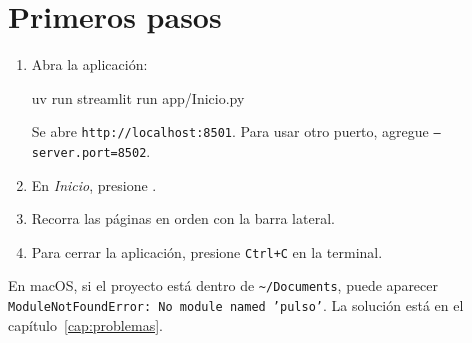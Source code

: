 \section{Primeros pasos}
\begin{enumerate}
\item Abra la aplicación:
\begin{terminal}
uv run streamlit run app/Inicio.py
\end{terminal}
Se abre \texttt{http://localhost:8501}. Para usar otro puerto, agregue
\texttt{--server.port=8502}.
\item En \emph{Inicio}, presione .
\item Recorra las páginas en orden con la barra lateral.
\item Para cerrar la aplicación, presione \texttt{Ctrl+C} en la terminal.
\end{enumerate}

\begin{aviso}
En macOS, si el proyecto está dentro de \texttt{\textasciitilde/Documents}, puede aparecer
\texttt{ModuleNotFoundError: No module named 'pulso'}. La solución está en el
capítulo~\ref{cap:problemas}.
\end{aviso}

